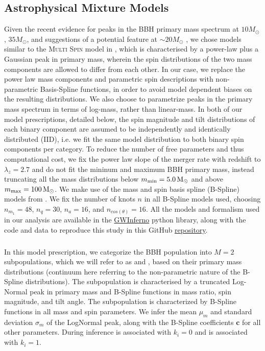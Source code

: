 \subsection{Astrophysical Mixture Models} \label{sec:astromodels} 

Given the recent evidence for peaks in the BBH primary mass spectrum at $10 M_{\odot}$, $35 M_{\odot}$, and suggestions of a potential feature at $\sim20 M_{\odot}$ \citep{10.3847/2041-8213/aa9bf6, 10.3847/1538-4357/aab34c, 10.3847/2041-8213/ab3800, 2021ApJ...913L...7A, 2111.03634, 2022ApJ...928..155T,2022arXiv221012834E}, we chose models similar to the \textsc{Multi Spin} model in \cite{2021ApJ...913L...7A}, which is characterised by a power-law plus a Gaussian peak in primary mass, wherein the spin distributions of the two mass components are allowed to differ from each other. In our case, we replace the power law mass components and parametric spin descriptions with non-parametric Basis-Spline functions, in order to avoid model dependent biases on the resulting distributions.
We also choose to parametrize peaks in the primary mass spectrum in terms of log-mass, rather than linear-mass. 
In both of our model prescriptions, detailed below, the spin magnitude and tilt distributions of each binary component are assumed to be independently and identically distributed (IID), i.e. we fit the same model distribution to both binary spin components per category. To reduce the number of free parameters and thus computational cost, we fix the power law slope of the merger rate with redshift to $\lambda_z=2.7$ and do not fit the mininum and maximum BBH primary mass, instead truncating all the mass distributions below $m_\text{min} = 5.0{\,\rm M}_\odot$ and above $m_\text{max} = 100{\,\rm M}_\odot$. We make use of the mass and spin basis spline (B-Spline) models from \cite{2022arXiv221012834E}. We fix the number of knots $n$ in all B-Spline models used, choosing $n_{m_1}=48$, $n_{q}=30$, $n_a=16$, and $n_{cos(\theta)}=16$. All the models and formalism used in our analysis are available in the \href{https://git.ligo.org/bruce.edelman/gwinferno}{GWInferno} python library, along with the code and data to reproduce this study in this GitHub \href{https://github.com/jaxeng/paper}{repository}. 



\subsubsection{\base{}}
In this model prescription, we categorize the BBH population into $M=2$ subpopulations, which we will refer to as \first{} and \contB{}, based on their primary mass distributions (continuum here referring to the non-parametric nature of the B-Spline distributions). The \first{} subpopulation is characterised by a truncated Log-Normal peak in primary mass and B-Spline functions in mass ratio, spin magnitude, and tilt angle. The \contB{} subpopulation is characterized by B-Spline functions in all mass and spin parameters. We infer the mean $\mu_m$ and standard deviation $\sigma_m$ of the LogNormal peak, along with the B-Spline coefficients $\mathbf{c}$ for all other parameters. During inference \first{} is associated with $k_i = 0$ and \contB{} is associated with $k_i = 1$.

